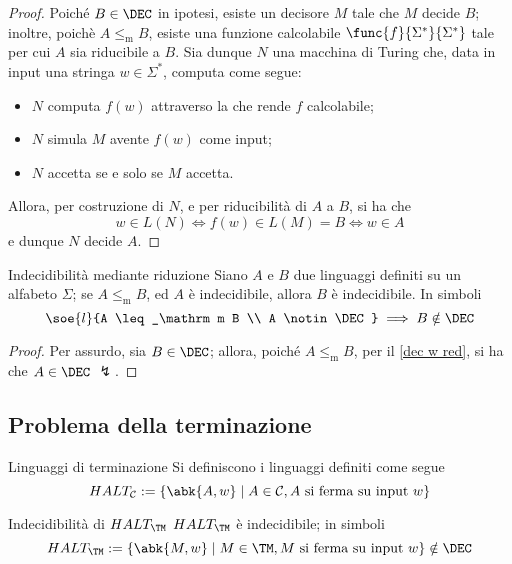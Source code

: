 \documentclass[a4paper, 12pt]{report}
\begin{document}
    \begin{proof}
        Poiché $B \in \DEC$ in ipotesi, esiste un decisore $M$ tale che $M$ decide $B$; inoltre, poichè $A \leq_\mathrm m B$, esiste una funzione calcolabile $\func{f}{\Sigma^*}{\Sigma^*}$ tale per cui $A$ sia riducibile a $B$. Sia dunque $N$ una macchina di Turing che, data in input una stringa $w \in \Sigma^*$, computa come segue:

        \begin{itemize}
            \item $N$ computa $f(w)$ attraverso la \TM che rende $f$ calcolabile;
            \item $N$ simula $M$ avente $f(w)$ come input; 
            \item $N$ accetta se e solo se $M$ accetta.
        \end{itemize}

        Allora, per costruzione di $N$, e per riducibilità di $A$ a $B$, si ha che $$w \in L(N) \iff f(w) \in L(M) = B \iff w \in A$$ e dunque $N$ decide $A$.
    \end{proof}

    \begin{framedcor}[label={dec w red cor}]{Indecidibilità mediante riduzione}
        Siano $A$ e $B$ due linguaggi definiti su un alfabeto $\Sigma$; se $A \leq_\mathrm m B$, ed $A$ è indecidibile, allora $B$ è indecidibile. In simboli $$\soe{l}{A \leq_\mathrm m B \\ A \notin \DEC} \implies B \notin \DEC$$
    \end{framedcor}

    \begin{proof}
        Per assurdo, sia $B \in \DEC$; allora, poiché $A \leq_\mathrm m B$, per il \cref{dec w red}, si ha che $A \in \DEC$ $\lightning$.
    \end{proof}

    \subsection{Problema della terminazione}

    \begin{frameddefn}{Linguaggi di terminazione}
        Si definiscono  i linguaggi definiti come segue $$HALT_\mathcal{C} := \{\abk{A, w} \mid A \in \mathcal{C} , A \ \textrm{si ferma su input} \ w\}$$
    \end{frameddefn}

    \begin{framedthm}{Indecidibilità di $HALT_\TM$}
        $HALT_\TM$ è indecidibile; in simboli $$HALT_\TM := \{\abk{M, w} \mid M \in \TM , M \ \textrm{si ferma su input} \ w\} \notin \DEC$$
    \end{framedthm}
\end{document}
